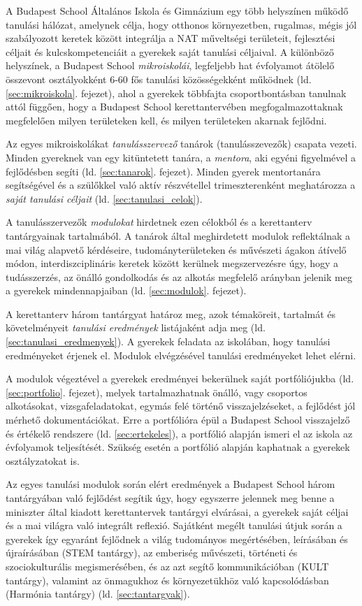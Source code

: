 A Budapest School Általános Iskola és Gimnázium egy több helyszínen működő
tanulási hálózat, amelynek célja, hogy otthonos környezetben, rugalmas, mégis
jól szabályozott keretek között integrálja a NAT
műveltségi
területeit, fejlesztési céljait és kulcskompetenciáit a gyerekek saját tanulási céljaival. A különböző helyszínek, a Budapest
School \emph{mikroiskolái}, legfeljebb hat évfolyamot átölelő összevont
osztályokként
6-60 fős tanulási közösségekként működnek (ld. \ref{sec:mikroiskola}. fejezet),
ahol a gyerekek többfajta
csoportbontásban tanulnak attól függően, hogy a Budapest School
kerettantervében megfogalmazottaknak megfelelően milyen területeken kell, és
milyen területeken akarnak fejlődni.

Az egyes mikroiskolákat \emph{tanulásszervező} tanárok (tanulásszevezők)
csapata
vezeti.
Minden gyereknek van egy kitüntetett tanára, a \emph{mentora},
aki egyéni figyelmével a fejlődésben segíti
(ld. \ref{sec:tanarok}. fejezet).
Minden gyerek mentortanára segítségével és a szülőkkel való aktív
részvétellel trimeszterenként meghatározza a \emph{saját tanulási céljait} (ld.
\ref{sec:tanulasi_celok}).

A tanulásszervezők \emph{modulokat} hirdetnek ezen célokból és a kerettanterv
tantárgyainak tartalmából. A tanárok által meghirdetett modulok reflektálnak a
mai világ alapvető kérdéseire, tudományterületeken és művészeti ágakon átívelő
módon, interdiszciplináris keretek között kerülnek megszervezésre úgy, hogy a
tudásszerzés, az önálló gondolkodás és az alkotás megfelelő arányban jelenik
meg a gyerekek mindennapjaiban (ld. \ref{sec:modulok}. fejezet).

A kerettanterv három tantárgyat határoz meg, azok
témaköreit, tartalmát és követelményeit \emph{tanulási eredmények}
listájaként adja meg (ld. \ref{sec:tanulasi_eredmenyek}). A gyerekek feladata
az iskolában, hogy tanulási eredményeket
érjenek el. Modulok elvégzésével tanulási eredményeket lehet
elérni.

A modulok végeztével a gyerekek eredményei bekerülnek saját portfóliójukba (ld.
\ref{sec:portfolio}. fejezet),
melyek tartalmazhatnak önálló, vagy csoportos alkotásokat, vizsgafeladatokat,
egymás felé történő visszajelzéseket, a fejlődést jól mérhető dokumentációkat.
Erre a portfólióra épül a Budapest School visszajelző és értékelő rendszere (ld. \ref{sec:ertekeles}), a
portfólió alapján ismeri el az iskola az évfolyamok teljesítését. Szükség
esetén a portfólió alapján kaphatnak a gyerekek osztályzatokat is.

Az egyes
tanulási modulok során elért eredmények a Budapest School három tantárgyában
való fejlődést segítik úgy, hogy egyszerre jelennek meg benne a miniszter által
kiadott kerettantervek tantárgyi elvárásai, a gyerekek saját céljai és a mai
világra való integrált reflexió. Sajátként megélt tanulási útjuk során a
gyerekek így egyaránt fejlődnek a világ tudományos megértésében, leírásában és
újraírásában (STEM tantárgy), az emberiség művészeti, történeti és
szociokulturális
megismerésében, és az azt segítő kommunikáció\-ban (KULT tantárgy), valamint az
önmagukhoz
és környezetükhöz való kapcsolódásban (Harmónia tantárgy) (ld.
\ref{sec:tantargyak}).




\ifkerettanterv
  
\fi
